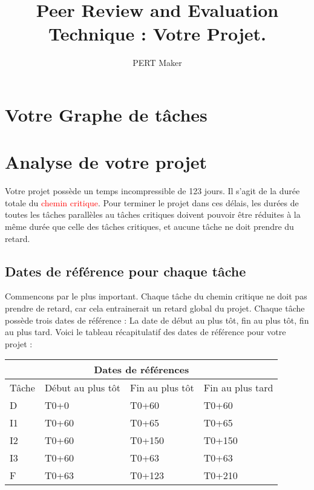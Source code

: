\documentclass{article}
\title{\centering Peer Review and Evaluation Technique : Votre Projet. 
}
\author{PERT Maker}
\begin{document}
\maketitle
\tableofcontents{}
\section{Votre Graphe de tâches}
\begin{center}
\end{center}
\section{Analyse de votre projet}
Votre projet possède un temps incompressible de 123 jours.
    Il s'agit de la durée totale du \textcolor{red}{chemin critique}.
    Pour terminer le projet dans ces délais, les durées de toutes les tâches parallèles au tâches critiques doivent pouvoir être réduites
    à la même durée que celle des tâches critiques, et aucune tâche ne doit prendre du retard.\subsection{Dates de référence pour chaque tâche}Commencons par le plus important. Chaque tâche du chemin critique ne doit pas prendre de
    retard, car cela entrainerait un retard global du projet.
    Chaque tâche possède trois dates de référence : La date de début au plus tôt,
    fin au plus tôt, fin au plus tard.
    Voici le tableau récapitulatif des dates de référence pour votre projet :\newline 
\begin{tabular}{ |p{3cm}||p{3cm}|p{3cm}|p{3cm}|  }
        \hline
        \multicolumn{4}{|c|}{Dates de références} \\
        \hline 
        Tâche&Début au plus tôt&Fin au plus tôt&Fin au plus tard \\ 
        \hline 
 D&T0+0&T0+60&T0+60 \\ 
 I1&T0+60&T0+65&T0+65 \\ 
 I2&T0+60&T0+150&T0+150 \\ 
 I3&T0+60&T0+63&T0+63 \\ 
 F&T0+63&T0+123&T0+210 \\ 
\hline
    \end{tabular} 
\end{document}

